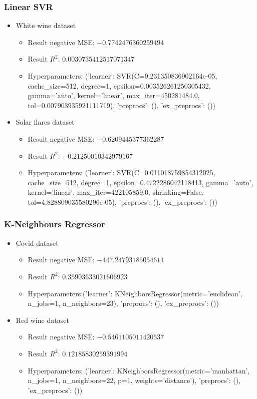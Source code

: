 \documentclass{beamer}
\begin{document}
\frame
{
  \frametitle{Linear SVR}

  \begin{itemize}
    \item White wine dataset
    \begin{itemize}
      \item Result negative MSE: $-0.7742476360259494$
      \item Result $R^{2}$: $0.0030735412517071347$
      \item Hyperparameters: ('learner': SVR(C=9.231350836902164e-05, cache\_size=512, degree=1,
      epsilon=0.003526261250305432, gamma='auto', kernel='linear',
      max\_iter=450281484.0, tol=0.007903935921111719), 'preprocs': (), 'ex\_preprocs': ())
    \end{itemize}
    \item Solar flares dataset
    \begin{itemize}
      \item Result negative MSE: $-0.6209445377362287$
      \item Result $R^{2}$: $-0.21250010342979167$
      \item Hyperparameters: ('learner': SVR(C=0.011018759854312025, cache\_size=512, degree=1,
      epsilon=0.4722286042118413, gamma='auto', kernel='linear',
      max\_iter=422105859.0, shrinking=False, tol=4.828809035580296e-05), 'preprocs': (), 'ex\_preprocs': ())
    \end{itemize}
  \end{itemize}
}

\frame
{
  \frametitle{K-Neighbours Regressor}

  \begin{itemize}
    \item Covid dataset
    \begin{itemize}
      \item Result negative MSE: $-447.24793185054614$
      \item Result $R^{2}$: $0.35903633021606923$
      \item Hyperparameters:('learner': KNeighborsRegressor(metric='euclidean', n\_jobs=1, n\_neighbors=23), 'preprocs': (), 'ex\_preprocs': ())
    \end{itemize}
    \item Red wine dataset
    \begin{itemize}
      \item Result negative MSE: $-0.5461105011420537$
      \item Result $R^{2}$: $0.12185830259391994$
      \item Hyperparameters: ('learner': KNeighborsRegressor(metric='manhattan', n\_jobs=1, n\_neighbors=22, p=1,
      weights='distance'), 'preprocs': (), 'ex\_preprocs': ())
    \end{itemize}
  \end{itemize}
}
\end{document}
